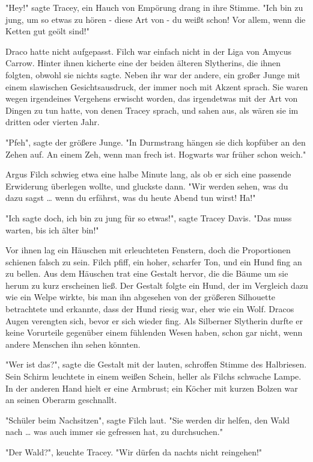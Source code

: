 {"Hey!" sagte Tracey, ein Hauch von Empörung drang in ihre Stimme. "Ich bin zu jung, um so etwas zu hören - diese Art von - du weißt schon! Vor allem, wenn die Ketten gut geölt sind!"

Draco hatte nicht aufgepasst. Filch war einfach nicht in der Liga von Amycus Carrow. Hinter ihnen kicherte eine der beiden älteren Slytherins, die ihnen folgten, obwohl sie nichts sagte. Neben ihr war der andere, ein großer Junge mit einem slawischen Gesichtsausdruck, der immer noch mit Akzent sprach. Sie waren wegen irgendeines Vergehens erwischt worden, das irgendetwas mit der Art von Dingen zu tun hatte, von denen Tracey sprach, und sahen aus, als wären sie im dritten oder vierten Jahr.

"Pfeh", sagte der größere Junge. "In Durmstrang hängen sie dich kopfüber an den Zehen auf. An einem Zeh, wenn man frech ist. Hogwarts war früher schon weich."

Argus Filch schwieg etwa eine halbe Minute lang, als ob er sich eine passende Erwiderung überlegen wollte, und gluckste dann. "Wir werden sehen, was du dazu sagst … wenn du erfährst, was du heute Abend tun wirst! Ha!"

"Ich sagte doch, ich bin zu jung für so etwas!", sagte Tracey Davis. "Das muss warten, bis ich älter bin!"

Vor ihnen lag ein Häuschen mit erleuchteten Fenstern, doch die Proportionen schienen falsch zu sein. Filch pfiff, ein hoher, scharfer Ton, und ein Hund fing an zu bellen. Aus dem Häuschen trat eine Gestalt hervor, die die Bäume um sie herum zu kurz erscheinen ließ. Der Gestalt folgte ein Hund, der im Vergleich dazu wie ein Welpe wirkte, bis man ihn abgesehen von der größeren Silhouette betrachtete und erkannte, dass der Hund riesig war, eher wie ein Wolf. Dracos Augen verengten sich, bevor er sich wieder fing. Als Silberner Slytherin durfte er keine Vorurteile gegenüber einem fühlenden Wesen haben, schon gar nicht, wenn andere Menschen ihn sehen könnten.

"Wer ist das?", sagte die Gestalt mit der lauten, schroffen Stimme des Halbriesen. Sein Schirm leuchtete in einem weißen Schein, heller als Filchs schwache Lampe. In der anderen Hand hielt er eine Armbrust; ein Köcher mit kurzen Bolzen war an seinen Oberarm geschnallt.

"Schüler beim Nachsitzen", sagte Filch laut. "Sie werden dir helfen, den Wald nach … was auch immer sie gefressen hat, zu durchsuchen."

"Der Wald?", keuchte Tracey. "Wir dürfen da nachts nicht reingehen!"

}
